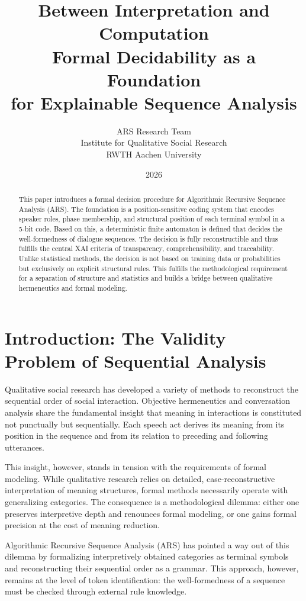 \documentclass[
  12pt,
  a4paper,
  oneside,
  titlepage
]{article}
\title{\Huge\textbf{Between Interpretation and Computation} \\
       \LARGE Formal Decidability as a Foundation \\
       \LARGE for Explainable Sequence Analysis}
\author{
  \large
  \begin{tabular}{c}
    ARS Research Team \\
    Institute for Qualitative Social Research \\
    RWTH Aachen University
  \end{tabular}
}
\date{\large 2026}
\begin{document}
\maketitle

\begin{abstract}
This paper introduces a formal decision procedure for Algorithmic Recursive 
Sequence Analysis (ARS). The foundation is a position-sensitive coding system 
that encodes speaker roles, phase membership, and structural position of each 
terminal symbol in a 5-bit code. Based on this, a deterministic finite automaton 
is defined that decides the well-formedness of dialogue sequences. The decision 
is fully reconstructible and thus fulfills the central XAI criteria of 
transparency, comprehensibility, and traceability. Unlike statistical methods, 
the decision is not based on training data or probabilities but exclusively on 
explicit structural rules. This fulfills the methodological requirement for a 
separation of structure and statistics and builds a bridge between qualitative 
hermeneutics and formal modeling.
\end{abstract}

\newpage
\tableofcontents
\newpage

\section{Introduction: The Validity Problem of Sequential Analysis}

Qualitative social research has developed a variety of methods to reconstruct 
the sequential order of social interaction. Objective hermeneutics 
\citep{Oevermann1979} and conversation analysis \citep{Sacks1974} share the 
fundamental insight that meaning in interactions is constituted not punctually 
but sequentially. Each speech act derives its meaning from its position in the 
sequence and from its relation to preceding and following utterances.

This insight, however, stands in tension with the requirements of formal 
modeling. While qualitative research relies on detailed, case-reconstructive 
interpretation of meaning structures, formal methods necessarily operate with 
generalizing categories. The consequence is a methodological dilemma: either 
one preserves interpretive depth and renounces formal modeling, or one gains 
formal precision at the cost of meaning reduction.

Algorithmic Recursive Sequence Analysis (ARS) has pointed a way out of this 
dilemma by formalizing interpretively obtained categories as terminal symbols 
and reconstructing their sequential order as a grammar. This approach, however, 
remains at the level of token identification: the well-formedness of a sequence 
must be checked through external rule knowledge.
\end{document}
